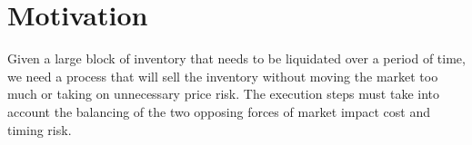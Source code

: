\section*{Motivation}
Given a large block of inventory that needs to be liquidated over a period of time, we need a process that will sell the inventory without moving the market too much or taking on unnecessary price risk. The execution steps must take into account the balancing of the two opposing forces of market impact cost and timing risk.